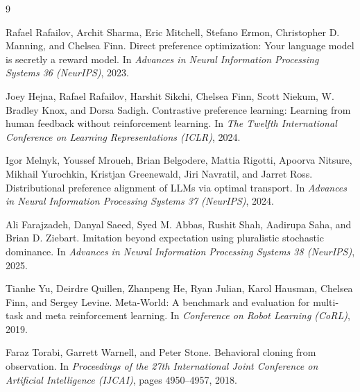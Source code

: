 \documentclass[11pt]{article}
\begin{document}
\newpage
\begin{thebibliography}{9}

Rafael Rafailov, Archit Sharma, Eric Mitchell, Stefano Ermon, Christopher D. Manning, and Chelsea Finn.
\newblock Direct preference optimization: Your language model is secretly a reward model.
\newblock In \emph{Advances in Neural Information Processing Systems 36 (NeurIPS)}, 2023.

Joey Hejna, Rafael Rafailov, Harshit Sikchi, Chelsea Finn, Scott Niekum, W. Bradley Knox, and Dorsa Sadigh.
\newblock Contrastive preference learning: Learning from human feedback without reinforcement learning.
\newblock In \emph{The Twelfth International Conference on Learning Representations (ICLR)}, 2024.

Igor Melnyk, Youssef Mroueh, Brian Belgodere, Mattia Rigotti, Apoorva Nitsure, Mikhail Yurochkin, Kristjan Greenewald, Jiri Navratil, and Jarret Ross.
\newblock Distributional preference alignment of {LLMs} via optimal transport.
\newblock In \emph{Advances in Neural Information Processing Systems 37 (NeurIPS)}, 2024.

Ali Farajzadeh, Danyal Saeed, Syed M. Abbas, Rushit Shah, Aadirupa Saha, and Brian D. Ziebart.
\newblock Imitation beyond expectation using pluralistic stochastic dominance.
\newblock In \emph{Advances in Neural Information Processing Systems 38 (NeurIPS)}, 2025.

Tianhe Yu, Deirdre Quillen, Zhanpeng He, Ryan Julian, Karol Hausman, Chelsea Finn, and Sergey Levine.
\newblock Meta-{W}orld: A benchmark and evaluation for multi-task and meta reinforcement learning.
\newblock In \emph{Conference on Robot Learning (CoRL)}, 2019.

Faraz Torabi, Garrett Warnell, and Peter Stone.
\newblock Behavioral cloning from observation.
\newblock In \emph{Proceedings of the 27th International Joint Conference on Artificial Intelligence (IJCAI)}, pages 4950--4957, 2018.

\end{thebibliography}
\end{document}

